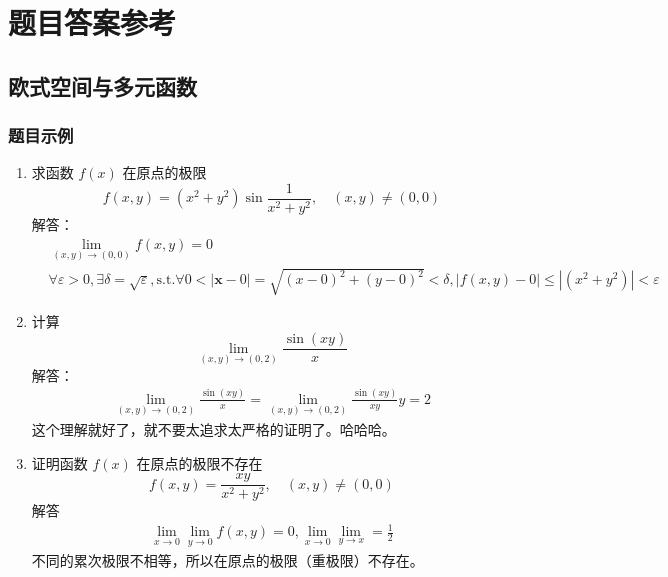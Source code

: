 \section{题目答案参考}
\subsection{欧式空间与多元函数}
\subsubsection{题目示例}
\begin{enumerate}
\item 求函数 $f(x)$ 在原点的极限
$$
f(x,y)=(x^2+y^2)\sin\frac1{x^2+y^2},\quad(x,y)\neq(0,0)
$$
解答：
\begin{align*}
    &\lim_{(x,y) \to (0,0)} f(x,y) = 0 \\
    &\forall \varepsilon > 0 , \exists \delta = \sqrt{\varepsilon} , \text{s.t.} \forall 0<|\mathbf{x}-0|=\sqrt{(x-0)^2 + (y-0)^2}<\delta, |f(x,y)-0|\le |(x^2+y^2)|< \varepsilon
\end{align*}


\item 计算
$$
\lim_{(x,y)\to(0,2)}\frac{\sin(xy)}x
$$
解答：
\begin{align*}
     \lim_{(x,y)\to(0,2)}\frac{\sin(xy)}x = \lim_{(x,y)\to(0,2)}\frac{\sin(xy)}{xy} y = 2
\end{align*}
这个理解就好了，就不要太追求太严格的证明了。哈哈哈。

\item 证明函数 $f(x)$ 在原点的极限不存在
$$
f(x,y)=\frac{xy}{x^2+y^2},\quad(x,y)\neq(0,0)
$$
解答
\begin{align*}
    \lim_{x\to 0} \lim_{y \to 0} f(x,y) = 0, \lim_{x \to 0}\lim_{y \to x} = \frac{1}{2}
\end{align*}
不同的累次极限不相等，所以在原点的极限（重极限）不存在。
\end{enumerate}
